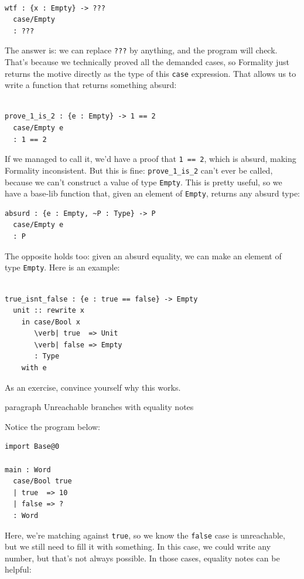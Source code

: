 \documentclass{article}
\theoremstyle{definition}
\theoremstyle{theorem}
\begin{document}
\begin{lstlisting}

wtf : {x : Empty} -> ???
  case/Empty
  : ???
\end{lstlisting}

The answer is: we can replace \verb|???| by anything, and the program will
check. That's because we technically proved all the demanded cases, so Formality
just returns the motive directly as the type of this \verb|case| expression.
That allows us to write a function that returns something absurd:

\begin{lstlisting}

prove_1_is_2 : {e : Empty} -> 1 == 2
  case/Empty e
  : 1 == 2
\end{lstlisting}

If we managed to call it, we'd have a proof that \verb|1 == 2|, which is absurd,
making Formality inconsistent. But this is fine: \verb|prove_1_is_2| can't ever
be called, because we can't construct a value of type \verb|Empty|. This is
pretty useful, so we have a base-lib function that, given an element of
\verb|Empty|, returns any absurd type:

\begin{lstlisting}
absurd : {e : Empty, ~P : Type} -> P
  case/Empty e
  : P
\end{lstlisting}

The opposite holds too: given an absurd equality, we can make an element of type
\verb|Empty|. Here is an example:

\begin{lstlisting}

true_isnt_false : {e : true == false} -> Empty
  unit :: rewrite x
    in case/Bool x
       \verb| true  => Unit
       \verb| false => Empty
       : Type
    with e
\end{lstlisting}

As an exercise, convince yourself why this works.

paragraph{ Unreachable branches with equality notes}

Notice the program below:

\begin{lstlisting}
import Base@0

main : Word
  case/Bool true
  | true  => 10
  | false => ?
  : Word
\end{lstlisting}

Here, we're matching against \verb|true|, so we know the \verb|false| case is
unreachable, but we still need to fill it with something. In this case, we could
write any number, but that's not always possible. In those cases, equality notes
can be helpful:
\end{document}
